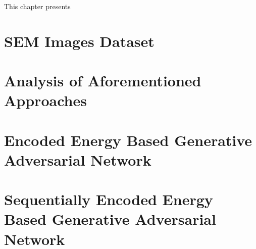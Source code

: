
\begingroup

This chapter presents

\section{SEM Images Dataset}

\section{Analysis of Aforementioned Approaches}

\section{Encoded Energy Based Generative Adversarial Network}

\section{Sequentially Encoded Energy Based Generative Adversarial Network}

\endgroup